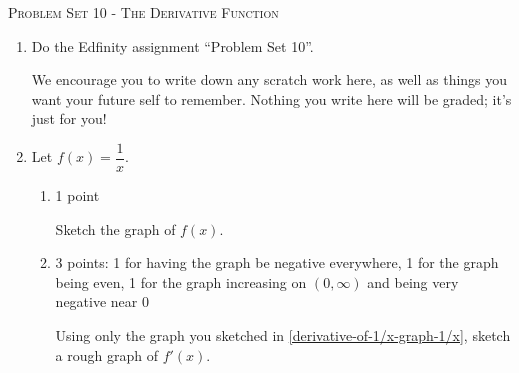 \documentclass{article}
\newcommand{\doedfinity}[2][\newpage]{
  \begin{problem}[#1]
    Do the Edfinity assignment ``Problem Set #2''.

    We encourage you to write down any scratch work here, as well as
    things you want your future self to remember. Nothing you write
    here will be graded; it's just for you!
  \end{problem}
}
\begin{document}
\begin{center}
  \large\textsc{Problem Set 10 - The Derivative Function}
\end{center}

\begin{enumerate}
\item  {}

  \doedfinity{10}

\item  

  Let $f(x)=\dfrac{1}{x}$.
  \begin{enumerate}

  \item \label{derivative-of-1/x-graph-1/x}

    \begin{grading}
      1 point
    \end{grading}

    \begin{problem}[\vfill]
      Sketch the graph of $f(x)$. 
    \end{problem}

    \begin{solution}       
      \begin{center}
      \end{center}
    \end{solution}

  \item \label{derivative-of-1/x-graph}

    \begin{grading}
      3 points: 1 for having the graph be negative everywhere, 1 for the graph being even, 1 for the graph increasing on $(0, \infty)$ and being very negative near 0
    \end{grading} 

    \begin{problem}[\vfill]
      Using only the graph you sketched in \ref{derivative-of-1/x-graph-1/x}, sketch a rough graph of $f'(x)$. 
    \end{problem}


\end{enumerate}
\end{enumerate}
\end{document}
